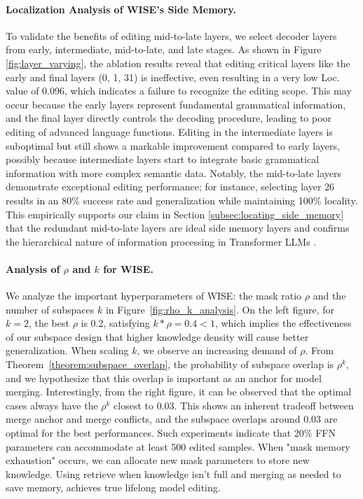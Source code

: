 \paragraph{Localization Analysis of WISE's Side Memory.}
\label{subsec:layer_selection}
To validate the benefits of editing mid-to-late layers, we select decoder layers from early, intermediate, mid-to-late, and late stages.
As shown in Figure \ref{fig:layer_varying}, the ablation results reveal that editing critical layers like the early and final layers (0, 1, 31) is ineffective, even resulting in a very low Loc. value of 0.096, which indicates a failure to recognize the editing scope.
This may occur because the early layers represent fundamental grammatical information, and the final layer directly controls the decoding procedure, leading to poor editing of advanced language functions.
Editing in the intermediate layers is suboptimal but still shows a markable improvement compared to early layers, possibly because intermediate layers start to integrate basic grammatical information with more complex semantic data.
Notably, the mid-to-late layers demonstrate exceptional editing performance; for instance, selecting layer 26 results in an 80\% success rate and generalization while maintaining 100\% locality.
This empirically supports our claim in Section \ref{subsec:locating_side_memory} that the redundant mid-to-late layers \cite{shortgpt} are ideal side memory layers and confirms the hierarchical nature of information processing in Transformer LLMs \cite{hierarchy_1, hierarchy_2}.

\paragraph{Analysis of $\rho$ and $k$ for WISE.} We analyze the important hyperparameters of WISE: the mask ratio $\rho$ and the number of subspaces $k$ in Figure~\ref{fig:rho_k_analysis}.
On the left figure, for $k=2$, the best $\rho$ is 0.2, satisfying $k*\rho=0.4<1$, which implies the effectiveness of our subspace design that higher knowledge density will cause better generalization. When scaling $k$, we observe an increasing demand of $\rho$. From Theorem~\ref{theorem:subspace_overlap}, the probability of subspace overlap is $\rho^k$, and we hypothesize that this overlap is important as an anchor for model merging. Interestingly, from the right figure, it can be observed that the optimal cases always have the $\rho^k$ closest to 0.03. This shows an inherent tradeoff between merge anchor and merge conflicts, and the subspace overlaps around 0.03 are optimal for the best performances. Such experiments indicate that 20\% FFN parameters can accommodate at least 500 edited samples. When "mask memory exhaustion" occurs, we can allocate new mask parameters to store new knowledge. Using retrieve when knowledge isn't full and merging as needed to save memory, achieves true lifelong model editing.

